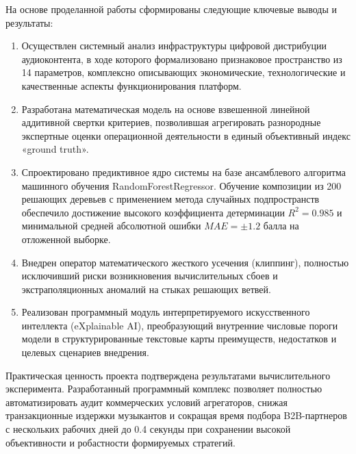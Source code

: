 \documentclass[14pt, a4paper]{extarticle}
\begin{document}
На основе проделанной работы сформированы следующие ключевые выводы и результаты:
\begin{enumerate}
    \item Осуществлен системный анализ инфраструктуры цифровой дистрибуции аудиоконтента, в ходе которого формализовано признаковое пространство из 14 параметров, комплексно описывающих экономические, технологические и качественные аспекты функционирования платформ.
    \item Разработана математическая модель на основе взвешенной линейной аддитивной свертки критериев, позволившая агрегировать разнородные экспертные оценки операционной деятельности в единый объективный индекс «ground truth».
    \item Спроектировано предиктивное ядро системы на базе ансамблевого алгоритма машинного обучения RandomForestRegressor. Обучение композиции из 200 решающих деревьев с применением метода случайных подпространств обеспечило достижение высокого коэффициента детерминации $R^2 = 0.985$ и минимальной средней абсолютной ошибки $MAE = \pm1.2$ балла на отложенной выборке.
    \item Внедрен оператор математического жесткого усечения (клиппинг), полностью исключивший риски возникновения вычислительных сбоев и экстраполяционных аномалий на стыках решающих ветвей.
    \item Реализован программный модуль интерпретируемого искусственного интеллекта (eXplainable AI), преобразующий внутренние числовые пороги модели в структурированные текстовые карты преимуществ, недостатков и целевых сценариев внедрения.
\end{enumerate}

Практическая ценность проекта подтверждена результатами вычислительного эксперимента. Разработанный программный комплекс позволяет полностью автоматизировать аудит коммерческих условий агрегаторов, снижая транзакционные издержки музыкантов и сокращая время подбора B2B-партнеров с нескольких рабочих дней до 0.4 секунды при сохранении высокой объективности и робастности формируемых стратегий.
\end{document}
